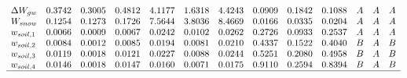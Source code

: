 \[\begin{array}{lcccccccccccc}
    \Delta W_{gw} & 0.3742            & 0.3005            & 0.4812             & 4.1177          & 1.6318          & 4.4243          & 0.0909   & 0.1842   & 0.1088    & A    & A    & A     \\
    W_{snow}      & 0.1254            & 0.1273            & 0.1726             & 7.5644          & 3.8036          & 8.4669          & 0.0166   & 0.0335   & 0.0204    & A    & A    & A     \\
    w_{soil,1}    & 0.0066            & 0.0009            & 0.0067             & 0.0242          & 0.0102          & 0.0262          & 0.2726   & 0.0933   & 0.2537    & A    & A    & A     \\
    w_{soil,2}    & 0.0084            & 0.0012            & 0.0085             & 0.0194          & 0.0081          & 0.0210          & 0.4337   & 0.1522   & 0.4040    & B    & A    & B     \\
    w_{soil,3}    & 0.0119            & 0.0018            & 0.0121             & 0.0227          & 0.0088          & 0.0244          & 0.5251   & 0.2080   & 0.4958    & B    & A    & B     \\
    w_{soil,4}    & 0.0146            & 0.0018            & 0.0147             & 0.0160          & 0.0071          & 0.0175          & 0.9110   & 0.2594   & 0.8394    & B    & A    & B     \\
    \hline
  \end{array}
\]
